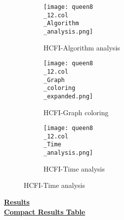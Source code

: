 \documentclass[10pt]{article}
\begin{document}
\graphicspath{{./Core1/Solutions/HCFI/queen8\_12.col}}
\begin{figure}[H]
\begin{subfigure}{.33\textwidth}
  \centering
  \texttt{[image: queen8\\\_12.col\\\_Algorithm\\\_analysis.png]}
  \caption{HCFI-Algorithm analysis}
   \label{fig:subfig1}
\end{subfigure}%
\begin{subfigure}{.33\textwidth}
  \centering
  \texttt{[image: queen8\\\_12.col\\\_Graph\\\_coloring\\\_expanded.png]}
  \caption{HCFI-Graph coloring}
  \label{fig:subfig2}
\end{subfigure}
\begin{subfigure}{.33\textwidth}
  \centering
  \texttt{[image: queen8\\\_12.col\\\_Time\\\_analysis.png]}
  \caption{HCFI-Time analysis}
  \end{subfigure}
\end{figure}
\vspace{2cm}
\begin{center}
\hyperlink{page.8}{\textbf{Results}}\\
\vspace{0.5cm}
\hyperlink{page.71}{\textbf{Compact Results Table}}
\end{center}
\pagebreak%
\end{document}
